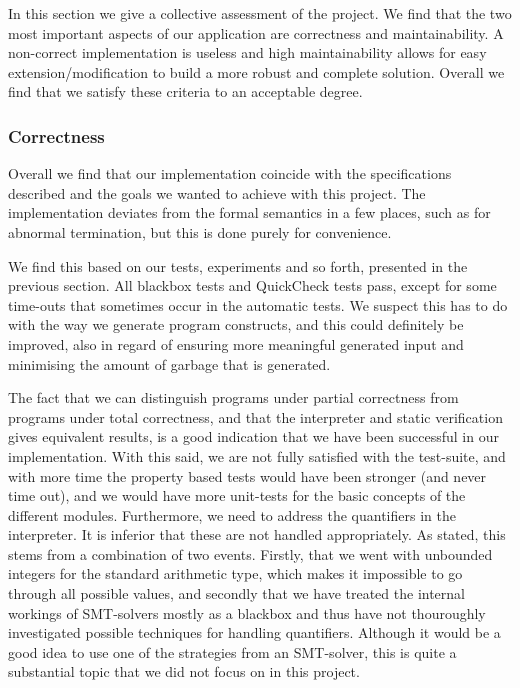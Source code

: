 In this section we give a collective assessment of the project.
We find that the two most important aspects of our application are correctness and maintainability. A non-correct implementation is useless and high maintainability allows for easy extension/modification to build a more robust and complete solution.
Overall we find that we satisfy these criteria to an acceptable degree.



\subsubsection{Correctness}
Overall we find that our implementation coincide with the specifications described and the goals we wanted to achieve with this project.
The implementation deviates from the formal semantics in a few places, such as for abnormal termination, but this is done purely for convenience.

We find this based on our tests, experiments and so forth, presented in the previous section.
All blackbox tests and QuickCheck tests pass, except for some time-outs that sometimes occur in the automatic tests. We suspect this has to do with the way we generate program constructs, and this could definitely be improved, also in regard of ensuring more meaningful generated input and minimising the amount of garbage that is generated.

The fact that we can distinguish programs under partial correctness from programs under total correctness, and that the interpreter and static verification gives equivalent results, is a good indication that we have been successful in our implementation.
With this said, we are not fully satisfied with the test-suite, and with more time the property based tests would have been stronger (and never time out), and we would have more unit-tests for the basic concepts of the different modules.
Furthermore, we need to address the quantifiers in the interpreter.
It is inferior that these are not handled appropriately.
As stated, this stems from a combination of two events.
Firstly, that we went with unbounded integers for the standard arithmetic type, which makes it impossible to go through all possible values, and secondly that we have treated the internal workings of SMT-solvers mostly as a blackbox and thus have not thouroughly investigated possible techniques for handling quantifiers. 
Although it would be a good idea to use one of the strategies from an SMT-solver, this is quite a substantial topic that we did not focus on in this project.

